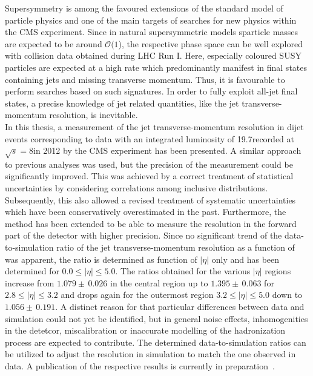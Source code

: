Supersymmetry is among the favoured extensions of the standard model of particle physics and one of the main targets of searches for new physics within the CMS experiment. Since in natural supersymmetric models sparticle masses are expected to be around $\mathcal{O}(1$\tev), the respective phase space can be well explored with \pp collision data obtained during LHC Run I. Here, especially coloured SUSY particles are expected at a high rate which predominantly manifest in final states containing jets and missing transverse momentum. Thus, it is favourable to perform searches based on such signatures. In order to fully exploit all-jet final states, a precise knowledge of jet related quantities, like the jet transverse-momentum resolution, is inevitable. \\
In this thesis, a measurement of the jet transverse-momentum resolution in dijet events corresponding to data with an integrated luminosity of 19.7\fbinv recorded at $\sqrt{s}=8$\tev in 2012 by the CMS experiment has been presented. A similar approach to previous analyses was used, but the precision of the measurement could be significantly improved. This was achieved by a correct treatment of statistical uncertainties by considering correlations among inclusive distributions. Subsequently, this also allowed a revised treatment of systematic uncertainties which have been conservatively overestimated in the past. Furthermore, the method has been extended to be able to measure the resolution in the forward part of the detector with higher precision. Since no significant trend of the data-to-simulation ratio of the jet transverse-momentum resolution as a function of \ptave was apparent, the ratio is determined as function of $|\eta|$ only and has been determined for $0.0 \leq |\eta| \leq 5.0$. The ratios obtained for the various $|\eta|$ regions increase from $1.079\pm \, 0.026$ in the central region up to $1.395\pm \, 0.063$ for $2.8 \leq |\eta| \leq 3.2$ and drops again for the outermost region $3.2 \leq |\eta| \leq 5.0$ down to $1.056\pm \, 0.191$. A distinct reason for that particular differences between data and simulation could not yet be identified, but in general noise effects, inhomogenities in the detetcor, miscalibration or inaccurate modelling of the hadronization process are expected to contribute. The determined data-to-simulation ratios can be utilized to adjust the resolution in simulation to match the one observed in data. A publication of the respective results is currently in preparation~\cite{CMS-JME-13-004}. \\
